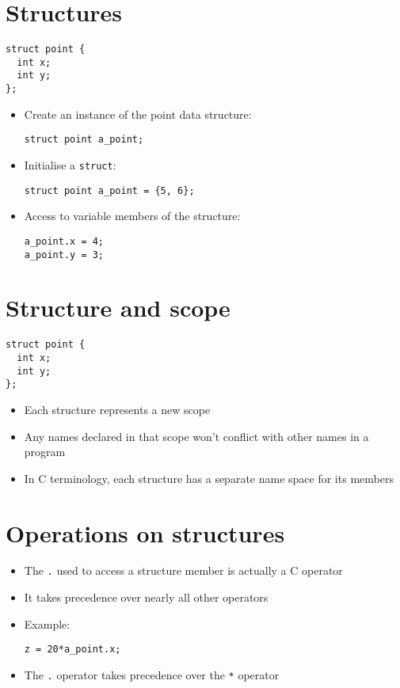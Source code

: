\documentclass{article}
\begin{document}
\section{Structures}
\begin{verbatim}
struct point {
  int x;
  int y;
};
\end{verbatim}

\begin{itemize}
\item Create an instance of the point data structure:
\begin{verbatim}
struct point a_point;
\end{verbatim}

\item Initialise a \verb!struct!:
\begin{verbatim}
struct point a_point = {5, 6};
\end{verbatim}

\item Access to variable members of the structure:
\begin{verbatim}
a_point.x = 4;
a_point.y = 3;
\end{verbatim}
\end{itemize}



\section{Structure and scope}
\begin{verbatim}
struct point {
  int x;
  int y;
};
\end{verbatim}

\begin{itemize}
\item Each structure represents a new scope

\item Any names declared in that scope won't conflict with other names in a program

\item In C terminology, each structure has a separate name space for its members
\end{itemize}



\section{Operations on structures}
\begin{itemize}
\item The \verb!.! used to access a structure member is actually a C operator
\item It takes precedence over nearly all other operators
\item Example:

\begin{verbatim}
z = 20*a_point.x;
\end{verbatim}

\item The \verb!.! operator takes precedence over the \verb!*! operator
\end{itemize}
\end{document}
